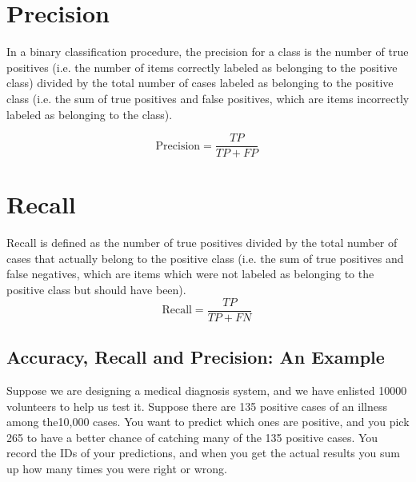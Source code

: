 \documentclass[]{report}
\begin{document}
\section*{Precision}
In a binary classification procedure, the precision for a class is the number of true positives (i.e. the number of items correctly labeled as belonging to the positive class) divided by the total number of cases labeled as belonging to the positive class (i.e. the sum of true positives and false positives, which are items incorrectly labeled as belonging to the class). 

\begin{equation}
\text{Precision}=\frac{TP}{TP+FP} \, 
\end{equation}
\section*{Recall}
Recall is defined as the number of true positives divided by the total number of cases that actually belong to the positive class (i.e. the sum of true positives and false negatives, which are items which were not labeled as belonging to the positive class but should have been).
\begin{equation}
\text{Recall}=\frac{TP}{TP+FN} \, 
\end{equation}
\subsection*{Accuracy, Recall and Precision: An Example}
Suppose we are designing a medical diagnosis system, and we have enlisted 10000 volunteers to help us test it. Suppose there are 135 positive cases of an illness among the10,000 cases. You want to predict which ones are positive, and you pick 265 to have a better chance of catching many of the 135 positive cases.  You record the IDs of your predictions, and when you get the actual results you sum up how many times you were right or wrong. \\ \medskip
\end{document}
